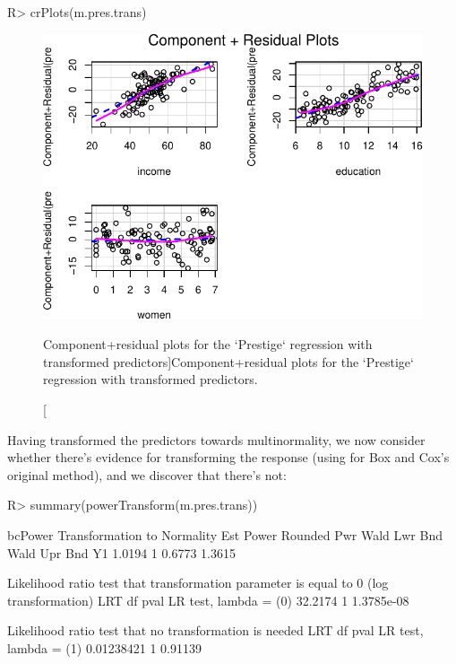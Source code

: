 \documentclass[
]{jss}
\begin{document}
\begin{CodeChunk}
\begin{CodeInput}
R> crPlots(m.pres.trans)
\end{CodeInput}
\begin{figure}

{\centering \includegraphics{JSS-article-reduced_files/figure-latex/CR-plots-transformed-1} 

}

\caption[Component+residual plots for the `Prestige` regression with transformed predictors]{Component+residual plots for the `Prestige` regression with transformed predictors.}\label{fig:CR-plots-transformed}
\end{figure}
\end{CodeChunk}

Having transformed the predictors towards multinormality, we now
consider whether there's evidence for transforming the response (using
 for Box and Cox's original method), and we
discover that there's not:

\begin{CodeChunk}
\begin{CodeInput}
R> summary(powerTransform(m.pres.trans))
\end{CodeInput}
\begin{CodeOutput}
bcPower Transformation to Normality 
   Est Power Rounded Pwr Wald Lwr Bnd Wald Upr Bnd
Y1    1.0194           1       0.6773       1.3615

Likelihood ratio test that transformation parameter is equal to 0
 (log transformation)
                          LRT df       pval
LR test, lambda = (0) 32.2174  1 1.3785e-08

Likelihood ratio test that no transformation is needed
                             LRT df    pval
LR test, lambda = (1) 0.01238421  1 0.91139
\end{CodeOutput}
\end{CodeChunk}
\end{document}
